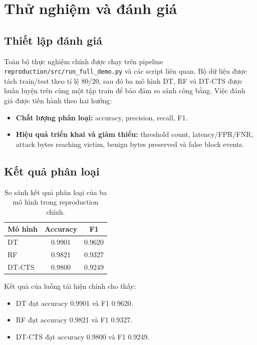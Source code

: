 \section{Thử nghiệm và đánh giá}

\subsection{Thiết lập đánh giá}

Toàn bộ thực nghiệm chính được chạy trên pipeline \texttt{reproduction/src/run\_full\_demo.py} và các script liên quan. Bộ dữ liệu được tách train/test theo tỉ lệ 80/20, sau đó ba mô hình DT, RF và DT-CTS được huấn luyện trên cùng một tập train để bảo đảm so sánh công bằng. Việc đánh giá được tiến hành theo hai hướng:
\begin{itemize}
\item \textbf{Chất lượng phân loại:} accuracy, precision, recall, F1.
\item \textbf{Hiệu quả triển khai và giảm thiểu:} threshold count, latency/FPR/FNR, attack bytes reaching victim, benign bytes preserved và false block events.
\end{itemize}

\subsection{Kết quả phân loại}

\begin{table}
\caption{So sánh kết quả phân loại của ba mô hình trong reproduction chính.}
\label{tab:classification-main}
\centering
\begin{tabular}{lcc}
\toprule
\textbf{Mô hình} & \textbf{Accuracy} & \textbf{F1} \\
\midrule
DT & 0.9901 & 0.9620 \\
RF & 0.9821 & 0.9327 \\
DT-CTS & 0.9800 & 0.9249 \\
\bottomrule
\end{tabular}
\end{table}

Kết quả của luồng tái hiện chính cho thấy:
\begin{itemize}
\item DT đạt accuracy 0.9901 và F1 0.9620.
\item RF đạt accuracy 0.9821 và F1 0.9327.
\item DT-CTS đạt accuracy 0.9800 và F1 0.9249.
\end{itemize}

